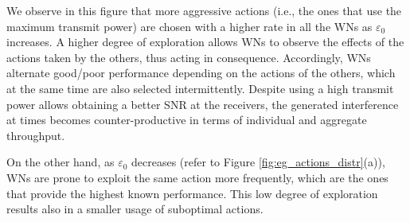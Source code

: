 \documentclass[10pt,journal,compsoc]{IEEEtran}
\begin{document}
	We observe in this figure that more aggressive actions (i.e., the ones that use the maximum transmit power) are chosen with a higher rate in all the WNs as $\varepsilon_0$ increases. A higher degree of exploration allows WNs to observe the effects of the actions taken by the others, thus acting in consequence. Accordingly, WNs alternate good/poor performance depending on the actions of the others, which at the same time are also selected intermittently. Despite using a high transmit power allows obtaining a better SNR at the receivers, the generated interference at times becomes counter-productive in terms of individual and aggregate throughput.	
	
	On the other hand, as $\varepsilon_0$ decreases (refer to Figure \ref{fig:eg_actions_distr}(a)), WNs are prone to exploit the same action more frequently, which are the ones that provide the highest known performance. This low degree of exploration results also in a smaller usage of suboptimal actions. 
	
\end{document}
